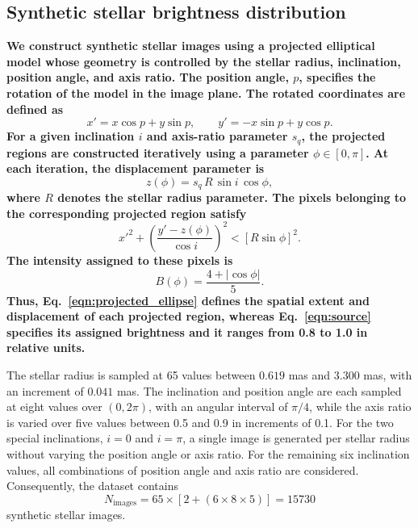\subsection{Synthetic stellar brightness distribution}\label{sec:source}
{\bf We construct synthetic stellar images using a projected elliptical model whose geometry is controlled by the stellar radius, inclination, position angle, and axis ratio. The position angle, $p$, specifies the rotation of the model in the image plane. The rotated coordinates are defined as
\begin{equation}
	x'=x\cos p+y\sin p,\qquad
	y'=-x\sin p+y\cos p.
\end{equation}
For a given inclination $i$ and axis-ratio parameter $s_q$, the projected regions are constructed iteratively using a parameter $\phi\in[0,\pi]$. At each iteration, the displacement parameter is
\begin{equation}
	z(\phi)=s_q \, R \, \sin i \, \cos \phi,
\end{equation}
where $R$ denotes the stellar radius parameter. The pixels belonging to the corresponding projected region satisfy
\begin{equation}
	x'^2+\left(\frac{y'-z(\phi)}{\cos i}\right)^2
	< \left[R\sin \phi\right]^2.
	\label{eqn:projected_ellipse}
\end{equation}
The intensity assigned to these pixels is
\begin{equation}
	B(\phi)=\frac{4+|\cos \phi|}{5}.
	\label{eqn:source}
\end{equation}
Thus, Eq.~\ref{eqn:projected_ellipse} defines the spatial extent and displacement of each projected region, whereas Eq.~\ref{eqn:source} specifies its assigned brightness and it ranges from 0.8 to 1.0 in relative units.
	
The stellar radius is sampled at 65 values between $0.619$ mas and $3.300$ mas, with an increment of $0.041$ mas. The inclination and position angle are each sampled at eight values over $(0,2\pi)$, with an angular interval of $\pi/4$, while the axis ratio is varied over five values between 0.5 and 0.9 in increments of 0.1. For the two special inclinations, $i=0$ and $i=\pi$, a single image is generated per stellar radius without varying the position angle or axis ratio. For the remaining six inclination values, all combinations of position angle and axis ratio are considered. Consequently, the dataset contains
\begin{equation}
	N_{\mathrm{images}}=65 \times \left[2+(6\times8\times5)\right]
	=15730
\end{equation}
synthetic stellar images.
	
}
